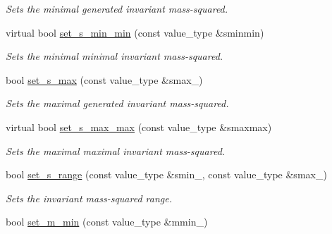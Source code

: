 \begin{DoxyCompactItemize}
\begin{DoxyCompactList}\small\item\em Sets the minimal generated invariant mass-\/squared. \end{DoxyCompactList}\item 
\hypertarget{a00482_a070c73f60e899493bd1aa6aa289633f7}{virtual bool \hyperlink{a00482_a070c73f60e899493bd1aa6aa289633f7}{set\-\_\-s\-\_\-min\-\_\-min} (const value\-\_\-type \&sminmin)}\label{a00482_a070c73f60e899493bd1aa6aa289633f7}

\begin{DoxyCompactList}\small\item\em Sets the minimal minimal invariant mass-\/squared. \end{DoxyCompactList}\item 
\hypertarget{a00482_a73f22a357774a5a341597a016700c349}{bool \hyperlink{a00482_a73f22a357774a5a341597a016700c349}{set\-\_\-s\-\_\-max} (const value\-\_\-type \&smax\-\_\-)}\label{a00482_a73f22a357774a5a341597a016700c349}

\begin{DoxyCompactList}\small\item\em Sets the maximal generated invariant mass-\/squared. \end{DoxyCompactList}\item 
\hypertarget{a00482_a6c1a254c4a0d824baee1d67e72fc9605}{virtual bool \hyperlink{a00482_a6c1a254c4a0d824baee1d67e72fc9605}{set\-\_\-s\-\_\-max\-\_\-max} (const value\-\_\-type \&smaxmax)}\label{a00482_a6c1a254c4a0d824baee1d67e72fc9605}

\begin{DoxyCompactList}\small\item\em Sets the maximal maximal invariant mass-\/squared. \end{DoxyCompactList}\item 
\hypertarget{a00482_ab9bb55b8341dffa5373ef0fb663a4b1b}{bool \hyperlink{a00482_ab9bb55b8341dffa5373ef0fb663a4b1b}{set\-\_\-s\-\_\-range} (const value\-\_\-type \&smin\-\_\-, const value\-\_\-type \&smax\-\_\-)}\label{a00482_ab9bb55b8341dffa5373ef0fb663a4b1b}

\begin{DoxyCompactList}\small\item\em Sets the invariant mass-\/squared range. \end{DoxyCompactList}\item 
\hypertarget{a00482_ac09ca9edd308332b33f297c053ef4a4a}{bool \hyperlink{a00482_ac09ca9edd308332b33f297c053ef4a4a}{set\-\_\-m\-\_\-min} (const value\-\_\-type \&mmin\-\_\-)}\label{a00482_ac09ca9edd308332b33f297c053ef4a4a}


\end{DoxyCompactItemize}

